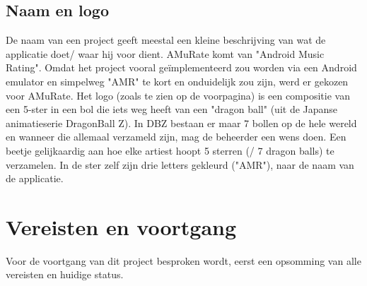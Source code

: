 \documentclass[11pt,a4paper]{article}
\begin{document}
	\subsection{Naam en logo}
		De naam van een project geeft meestal een kleine beschrijving van wat de applicatie doet/ waar hij voor dient. AMuRate komt van "Android Music Rating". Omdat het project vooral geïmplementeerd zou worden via een Android emulator en simpelweg "AMR" te kort en onduidelijk zou zijn, werd er gekozen voor AMuRate. Het logo (zoals te zien op de voorpagina) is een compositie van een 5-ster in een bol die iets weg heeft van een "dragon ball" (uit de Japanse animatieserie DragonBall Z). In DBZ bestaan er maar 7 bollen op de hele wereld en wanneer die allemaal verzameld zijn, mag de beheerder een wens doen. Een beetje gelijkaardig aan hoe elke artiest hoopt 5 sterren (/ 7 dragon balls) te verzamelen. 
	In de ster zelf zijn drie letters gekleurd ("AMR"), naar de naam van de applicatie.
\newpage %
\section{Vereisten en voortgang}
Voor de voortgang van dit project besproken wordt, eerst een opsomming van alle vereisten en huidige status. \\
\end{document}
